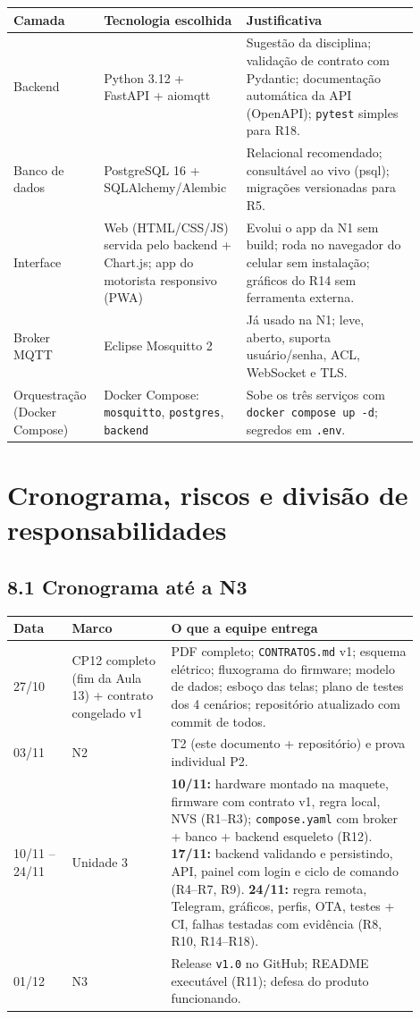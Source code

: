 \documentclass[11pt,a4paper]{article}
\newcommand{\cod}[1]{\texttt{#1}}
\begin{document}
\begin{longtable}{|p{0.20\linewidth}|p{0.30\linewidth}|p{0.40\linewidth}|}
\hline
\textbf{Camada} & \textbf{Tecnologia escolhida} & \textbf{Justificativa} \\ \hline \endhead
Backend & Python 3.12 + FastAPI + aiomqtt & Sugestão da disciplina; validação de contrato com Pydantic; documentação automática da API (OpenAPI); \cod{pytest} simples para R18. \\ \hline
Banco de dados & PostgreSQL 16 + SQLAlchemy/Alembic & Relacional recomendado; consultável ao vivo (psql); migrações versionadas para R5. \\ \hline
Interface & Web (HTML/CSS/JS) servida pelo backend + Chart.js; app do motorista responsivo (PWA) & Evolui o app da N1 sem build; roda no navegador do celular sem instalação; gráficos do R14 sem ferramenta externa. \\ \hline
Broker MQTT & Eclipse Mosquitto 2 & Já usado na N1; leve, aberto, suporta usuário/senha, ACL, WebSocket e TLS. \\ \hline
Orquestração (Docker Compose) & Docker Compose: \cod{mosquitto}, \cod{postgres}, \cod{backend} & Sobe os três serviços com \cod{docker compose up -d}; segredos em \cod{.env}. \\ \hline
\end{longtable}

\section{Cronograma, riscos e divisão de responsabilidades}
\subsection*{8.1 Cronograma até a N3}

\begin{longtable}{|p{0.13\linewidth}|p{0.22\linewidth}|p{0.55\linewidth}|}
\hline
\textbf{Data} & \textbf{Marco} & \textbf{O que a equipe entrega} \\ \hline \endhead
27/10 & CP12 completo (fim da Aula 13) + contrato congelado v1 & PDF completo; \cod{CONTRATOS.md} v1; esquema elétrico; fluxograma do firmware; modelo de dados; esboço das telas; plano de testes dos 4 cenários; repositório atualizado com commit de todos. \\ \hline
03/11 & N2 & T2 (este documento + repositório) e prova individual P2. \\ \hline
10/11 -- 24/11 & Unidade 3 & \textbf{10/11:} hardware montado na maquete, firmware com contrato v1, regra local, NVS (R1--R3); \cod{compose.yaml} com broker + banco + backend esqueleto (R12). \textbf{17/11:} backend validando e persistindo, API, painel com login e ciclo de comando (R4--R7, R9). \textbf{24/11:} regra remota, Telegram, gráficos, perfis, OTA, testes + CI, falhas testadas com evidência (R8, R10, R14--R18). \\ \hline
01/12 & N3 & Release \cod{v1.0} no GitHub; README executável (R11); defesa do produto funcionando. \\ \hline
\end{longtable}
\end{document}
